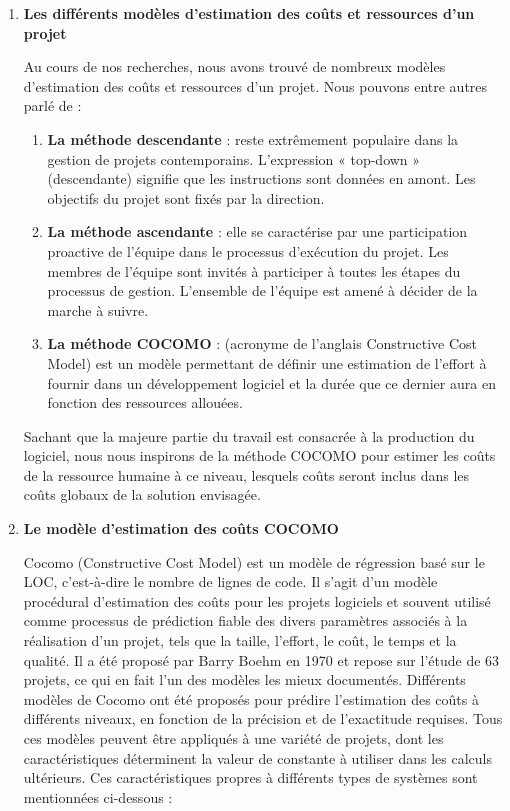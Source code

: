 \begin{enumerate}
	\item \textbf{Les différents modèles d'estimation des coûts et ressources d’un projet}

	      Au cours de nos recherches, nous avons trouvé de nombreux modèles d’estimation des coûts et ressources d’un projet. Nous pouvons entre autres parlé de :

	      \begin{enumerate}
		      \item \textbf{La méthode descendante} : reste extrêmement populaire dans la gestion de projets contemporains. L'expression « top-down » (descendante) signifie que les instructions sont données en amont. Les objectifs du projet sont fixés par la direction.
		      \item \textbf{La méthode ascendante} : elle se caractérise par une participation proactive de l'équipe dans le processus d'exécution du projet. Les membres de l'équipe sont invités à participer à toutes les étapes du processus de gestion. L'ensemble de l'équipe est amené à décider de la marche à suivre.
		      \item \textbf{La méthode COCOMO} : (acronyme de l'anglais Constructive Cost Model) est un modèle permettant de définir une estimation de l'effort à fournir dans un développement logiciel et la durée que ce dernier aura en fonction des ressources allouées.
	      \end{enumerate}

	      Sachant que la majeure partie du travail est consacrée à la production du logiciel, nous nous inspirons de la méthode COCOMO pour estimer les coûts de la ressource humaine à ce niveau, lesquels coûts seront inclus dans les coûts globaux de la solution envisagée.

	\item \textbf{Le modèle d'estimation des coûts COCOMO}

	      Cocomo (Constructive Cost Model) est un modèle de régression basé sur le LOC, c’est-à-dire le nombre de lignes de code. Il s’agit d’un modèle procédural d’estimation des coûts pour les projets logiciels et souvent utilisé comme processus de prédiction fiable des divers paramètres associés à la réalisation d’un projet, tels que la taille, l’effort, le coût, le temps et la qualité. Il a été proposé par Barry Boehm en 1970 et repose sur l’étude de 63 projets, ce qui en fait l’un des modèles les mieux documentés. Différents modèles de Cocomo ont été proposés pour prédire l’estimation des coûts à différents niveaux, en fonction de la précision et de l’exactitude requises. Tous ces modèles peuvent être appliqués à une variété de projets, dont les caractéristiques déterminent la valeur de constante à utiliser dans les calculs ultérieurs. Ces caractéristiques propres à différents types de systèmes sont mentionnées ci-dessous :


\end{enumerate}
